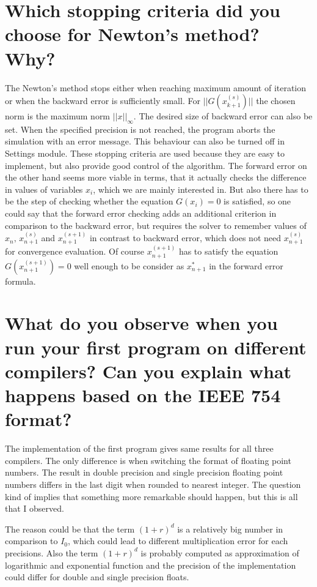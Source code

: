 \documentclass[a4paper]{article}
\begin{document}
\section{Which stopping criteria did you choose for Newton's method? Why?}
The Newton's method stops either when reaching maximum amount of iteration or when the backward error is sufficiently small. For $ ||G(x^{(s)}_{k+1})|| $ the chosen norm is the maximum norm $ ||x||_{\infty} $. The desired size of backward error can also be set. When the specified precision is not reached, the program aborts the simulation with an error message. This behaviour can also be turned off in Settings module. These stopping criteria are used because they are easy to implement, but also provide good control of the algorithm. The forward error on the other hand seems more viable in terms, that it actually checks the difference in values of variables $ x_i $, which we are mainly interested in. But also there has to be the step of checking whether the equation $ G(x_i)=0 $ is satisfied, so one could say that the forward error checking adds an additional criterion in comparison to the backward error, but requires the solver to remember values of $ x_n, \, x_{n+1}^{(s)} $ and $ x_{n+1}^{(s+1)} $ in contrast to backward error, which does not need $ x_{n+1}^{(s)} $ for convergence evaluation.
Of course  $ x_{n+1}^{(s+1)} $ has to satisfy the equation $ G(x_{n+1}^{(s+1)})=0 $ well enough to be consider as $ x_{n+1}^{*} $ in the forward error formula.

\section{What do you observe when you run your first program on different compilers? Can you explain what happens based on the IEEE 754 format?}
The implementation of the first program gives same results for all three compilers. The only difference is when switching the format of floating point numbers. The result in double precision and single precision floating point numbers differs in the last digit when rounded to nearest integer. The question kind of implies that something more remarkable should happen, but this is all that I observed.

The reason could be that the term $ (1+r)^d $ is a relatively big number in comparison to $ I_0 $, which could lead to different multiplication error for each precisions. Also the term $ (1+r)^d $ is probably computed as approximation of logarithmic and exponential function and the precision of the implementation could differ for double and single precision floats.
\end{document}
